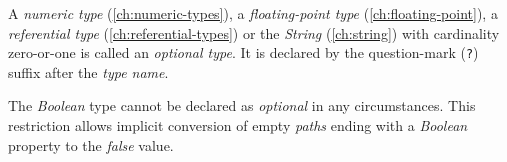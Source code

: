 A \emph{numeric type} (\ref{ch:numeric-types}),
a \emph{floating-point type} (\ref{ch:floating-point}),
a \emph{referential type} (\ref{ch:referential-types})
or the \emph{String} (\ref{ch:string})
with cardinality zero-or-one is called an \emph{optional type}.
It is declared by the question-mark (\verb|?|) suffix
after the \emph{type name}.

The \emph{Boolean} type cannot be declared as \emph{optional} in any circumstances.
This restriction allows implicit conversion of empty \emph{paths}
ending with a \emph{Boolean} property to the \emph{false} value.
